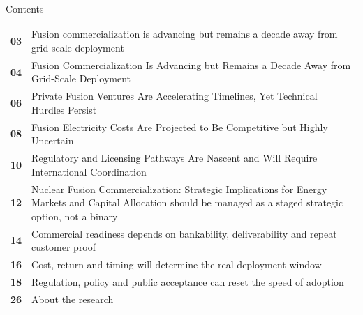 \documentclass[10pt,a4paper]{article}
\begin{document}
\clearpage
{\sffamily\fontsize{26}{31}\selectfont\color{BONavy} Contents}\par\vspace{10pt}
\begin{tabularx}{\linewidth}{p{14mm}Y}
\textcolor{BOGreen}{\bfseries 03} & Fusion commercialization is advancing but remains a decade away from grid-scale deployment \\[5pt]
\textcolor{BOGreen}{\bfseries 04} & Fusion Commercialization Is Advancing but Remains a Decade Away from Grid-Scale Deployment \\[5pt]
\textcolor{BOGreen}{\bfseries 06} & Private Fusion Ventures Are Accelerating Timelines, Yet Technical Hurdles Persist \\[5pt]
\textcolor{BOGreen}{\bfseries 08} & Fusion Electricity Costs Are Projected to Be Competitive but Highly Uncertain \\[5pt]
\textcolor{BOGreen}{\bfseries 10} & Regulatory and Licensing Pathways Are Nascent and Will Require International Coordination \\[5pt]
\textcolor{BOGreen}{\bfseries 12} & Nuclear Fusion Commercialization: Strategic Implications for Energy Markets and Capital Allocation should be managed as a staged strategic option, not a binary \\[5pt]
\textcolor{BOGreen}{\bfseries 14} & Commercial readiness depends on bankability, deliverability and repeat customer proof \\[5pt]
\textcolor{BOGreen}{\bfseries 16} & Cost, return and timing will determine the real deployment window \\[5pt]
\textcolor{BOGreen}{\bfseries 18} & Regulation, policy and public acceptance can reset the speed of adoption \\[5pt]
\textcolor{BOGreen}{\bfseries 26} & About the research \\[5pt]
\end{tabularx}
\clearpage
\end{document}
